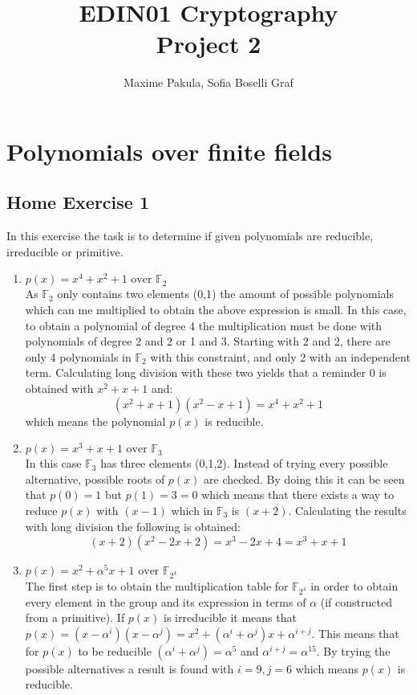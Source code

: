 \documentclass{article}
\title{EDIN01 Cryptography \\ Project 2}
\author{Maxime Pakula, Sofia Boselli Graf}
\begin{document}
\maketitle

\tableofcontents

\newpage


\section{Polynomials over finite fields}

\subsection{Home Exercise 1}
In this exercise the task is to determine if given polynomials are reducible, irreducible or primitive. 

\begin{enumerate}
    \item $p(x) = x^4 + x^2 + 1 \text{ over } \mathbb F_2$ \\
    As $\mathbb F_2$ only contains two elements (0,1) the amount of possible polynomials which can me multiplied to obtain the above expression is small. In this case, to obtain a polynomial of degree 4 the multiplication must be done with polynomials of degree 2 and 2 or 1 and 3. Starting with 2 and 2, there are only 4 polynomials in $\mathbb F_2$ with this constraint, and only 2 with an independent term. Calculating long division with these two yields that a reminder 0 is obtained with $x^2 + x + 1$ and:
    $$(x^2+x+1)(x^2-x+1) = x^4 + x^2 + 1$$
    which means the polynomial $p(x)$ is reducible.
    \item $p(x) = x^3 + x + 1 \text{ over } \mathbb F_3$ \\
    In this case $\mathbb F_3$ has three elements (0,1,2). Instead of trying every possible alternative, possible roots of $p(x)$ are checked. By doing this it can be seen that $p(0) = 1$ but $p(1) = 3 = 0$ which means that there exists a way to reduce $p(x)$ with $(x-1)$ which in $\mathbb F_3$ is $(x+2)$. Calculating the results with long division the following is obtained:
    $$(x+2)(x^2-2x+2) = x^3 - 2x + 4 = x^3 + x + 1$$
    \item  $p(x) = x^2 + \alpha^5 x + 1 \text{ over } \mathbb F_{2^4}$ \\
    The first step is to obtain the multiplication table for $\mathbb F_{2^4}$ in order to obtain every element in the group and its expression in terms of $\alpha$ (if constructed from a primitive). If $p(x)$ is irreducible it means that $p(x) = (x-\alpha^i)(x-\alpha^j) = x^2 + (\alpha^i + \alpha^j)x + \alpha^{i+j}$. This means that for $p(x)$ to be reducible $(\alpha^i + \alpha^j) = \alpha^5$ and  $\alpha^{i+j} = \alpha^15$. By trying the possible alternatives a result is found with $i = 9, j=6$ which means $p(x)$ is reducible.
\end{enumerate} 
\end{document}
